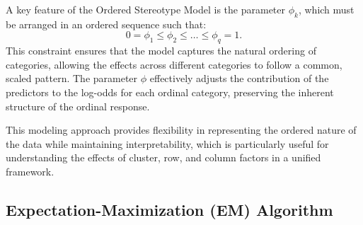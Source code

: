 \documentclass{article}
\begin{document}
A key feature of the Ordered Stereotype Model is the parameter \(\phi_k\), 
which must be arranged in an ordered sequence such that:
\[
0 = \phi_1 \leq \phi_2 \leq \ldots \leq \phi_q = 1.
\]
This constraint ensures that the model captures the natural ordering of categories, 
allowing the effects across different categories to follow a common, scaled pattern. 
The parameter \(\phi\) effectively adjusts the contribution of the predictors to the log-odds for each ordinal category, 
preserving the inherent structure of the ordinal response.

This modeling approach provides flexibility in representing the ordered nature of the data while maintaining interpretability, 
which is particularly useful for understanding the effects of cluster, row, and column factors in a unified framework.

  


\subsection{Expectation-Maximization (EM) Algorithm}





\end{document}
